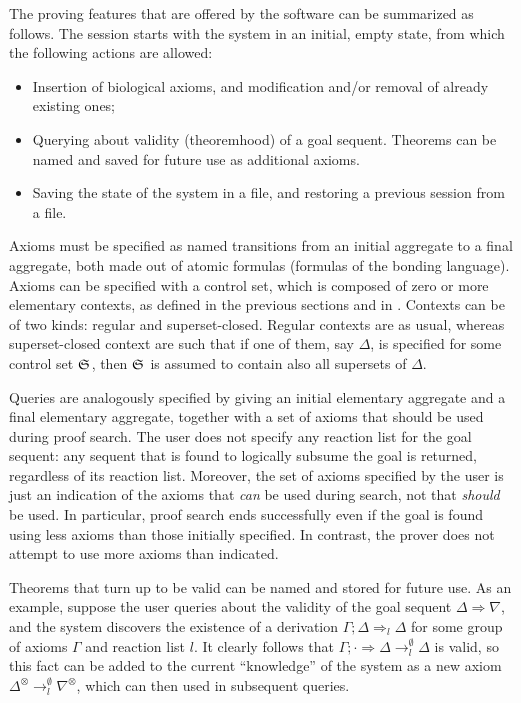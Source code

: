 The proving features that are offered by the software can be summarized as
follows. The session starts with the system in an initial, empty state, from
which the following actions are allowed:

\begin{itemize}
\item Insertion of biological axioms, and modification and/or removal of
  already existing ones;
\item Querying about validity (theoremhood) of a goal sequent.
  Theorems can be named and saved for future use as additional axioms.
\item Saving the state of the system in a file, and restoring a previous session
  from a file.
\end{itemize}

Axioms must be specified as named transitions from an initial aggregate to a
final aggregate, both made out of atomic formulas (formulas of the bonding
language). Axioms can be specified with a control set, which is composed of zero
or more elementary contexts, as defined in the previous sections and in
\cite{adding-logic}. Contexts can be of two kinds: regular and superset-closed.
Regular contexts are as usual, whereas superset-closed context are such that if
one of them, say $\Delta$, is specified for some control set $\mathfrak{S}_{}$, then
$\mathfrak{S}_{}$ is assumed to contain also all supersets of $\Delta$.

Queries are analogously specified by giving an initial elementary aggregate and
a final elementary aggregate, together with a set of axioms that should be used
during proof search. The user does not specify any reaction list for the goal
sequent: any sequent that is found to logically subsume the goal is returned,
regardless of its reaction list. Moreover, the set of axioms specified by the
user is just an indication of the axioms that \emph{can} be used during search,
not that \emph{should} be used. In particular, proof search ends successfully
even if the goal is found using less axioms than those initially specified. In
contrast, the prover does not attempt to use more axioms than indicated.

Theorems that turn up to be valid can be named and stored for future use. As an
example, suppose the user queries about the validity of the goal sequent
$\Delta \Longrightarrow \nabla$, and the system discovers the existence of a
derivation $\Gamma ; \Delta \Longrightarrow_l \Delta$ for some group of axioms
$\Gamma$ and reaction list $l$.  It clearly follows that
$\Gamma ; \cdot \Longrightarrow \Delta \rightarrow^{\emptyset}_l \Delta$ is
valid, so this fact can be added to the current ``knowledge'' of the system as
a new axiom $\Delta^{\otimes} \rightarrow_l^{\emptyset} \nabla^{\otimes}$, which can
then used in subsequent queries.

